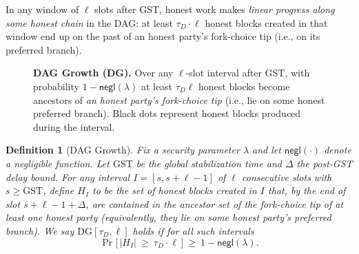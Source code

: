 \documentclass[11pt]{article}
\newtheorem{definition}[theorem]{Definition}
\newcommand{\negl}{\ensuremath{\mathsf{negl}}\xspace}
\begin{document}
In any window of $\ell$ slots after GST, honest work makes \emph{linear progress along some honest chain} in the DAG: at least $\tau_D\cdot \ell$ honest blocks created in that window end up on the past of an honest party’s fork-choice tip (i.e., on its preferred branch).

\begin{figure}[htp!]
\centering
{}
\caption{\textbf{DAG Growth (DG).}
\small
Over any $\ell$-slot interval after GST, with probability $1-\negl(\lambda)$ at least $\tau_D\ell$ honest blocks become ancestors of \emph{an honest party’s fork-choice tip} (i.e., lie on some honest preferred branch). 
Black dots represent honest blocks produced during the interval.}

\label{fig:dg}
\end{figure}

\begin{definition}[DAG Growth]\label{def:DG}
Fix a security parameter $\lambda$ and let $\negl(\cdot)$ denote a negligible function.
Let $\mathrm{GST}$ be the global stabilization time and $\Delta$ the post-GST delay bound.
For any interval $I=[s,s+\ell-1]$ of $\ell$ consecutive slots with $s\ge \mathrm{GST}$, define $H_I$ to be the set of honest blocks created in $I$ that, by the end of slot $s+\ell-1+\Delta$, are contained in the ancestor set of the fork-choice tip of at least one honest party (equivalently, they lie on some honest party’s preferred branch).
We say $\mathrm{DG}[\tau_D,\ell]$ holds if for all such intervals
\[
\Pr\!\big[\,|H_I|\ \ge\ \tau_D\cdot \ell\,\big]\ \ge\ 1-\negl(\lambda).
\]
\end{definition}
\end{document}
